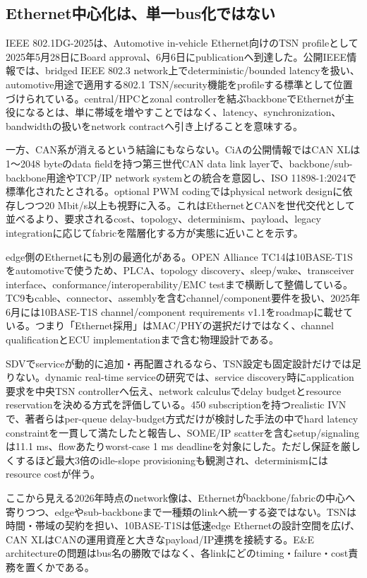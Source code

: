 \begin{surveyarticlebody}
\subsection{Ethernet中心化は、単一bus化ではない}

IEEE 802.1DG-2025は、Automotive in-vehicle Ethernet向けのTSN profileとして2025年5月28日にBoard approval、6月6日にpublicationへ到達した。公開IEEE情報では、bridged IEEE 802.3 network上でdeterministic/bounded latencyを扱い、automotive用途で適用する802.1 TSN/security機能をprofileする標準として位置づけられている。central/HPCとzonal controllerを結ぶbackboneでEthernetが主役になるとは、単に帯域を増やすことではなく、latency、synchronization、bandwidthの扱いをnetwork contractへ引き上げることを意味する。\autocite{src-0d68a9a04e3d,src-4e0a35202b0f}

一方、CAN系が消えるという結論にもならない。CiAの公開情報ではCAN XLは1〜2048 byteのdata fieldを持つ第三世代CAN data link layerで、backbone/sub-backbone用途やTCP/IP network systemとの統合を意図し、ISO 11898-1:2024で標準化されたとされる。optional PWM codingではphysical network designに依存しつつ20 Mbit/s以上も視野に入る。これはEthernetとCANを世代交代として並べるより、要求されるcost、topology、determinism、payload、legacy integrationに応じてfabricを階層化する方が実態に近いことを示す。\autocite{src-b7cb6b22b2e4}

edge側のEthernetにも別の最適化がある。OPEN Alliance TC14は10BASE-T1Sをautomotiveで使うため、PLCA、topology discovery、sleep/wake、transceiver interface、conformance/interoperability/EMC testまで横断して整備している。TC9もcable、connector、assemblyを含むchannel/component要件を扱い、2025年6月には10BASE-T1S channel/component requirements v1.1をroadmapに載せている。つまり「Ethernet採用」はMAC/PHYの選択だけではなく、channel qualificationとECU implementationまで含む物理設計である。\autocite{src-470ecee4f411,src-4df5f45556b0}

SDVでserviceが動的に追加・再配置されるなら、TSN設定も固定設計だけでは足りない。dynamic real-time serviceの研究では、service discovery時にapplication要求を中央TSN controllerへ伝え、network calculusでdelay budgetとresource reservationを決める方式を評価している。450 subscriptionを持つrealistic IVNで、著者らはper-queue delay-budget方式だけが検討した手法の中でhard latency constraintを一貫して満たしたと報告し、SOME/IP scatterを含むsetup/signalingは11.1 ms、flowあたりworst-case 1 ms deadlineを対象にした。ただし保証を厳しくするほど最大3倍のidle-slope provisioningも観測され、determinismにはresource costが伴う。\autocite{src-0b4e94520719}

ここから見える2026年時点のnetwork像は、Ethernetがbackbone/fabricの中心へ寄りつつ、edgeやsub-backboneまで一種類のlinkへ統一する姿ではない。TSNは時間・帯域の契約を担い、10BASE-T1Sは低速edge Ethernetの設計空間を広げ、CAN XLはCANの運用資産と大きなpayload/IP連携を接続する。E\&E architectureの問題はbus名の勝敗ではなく、各linkにどのtiming・failure・cost責務を置くかである。\autocite{src-0d68a9a04e3d,src-470ecee4f411,src-4e0a35202b0f,src-b7cb6b22b2e4}
\end{surveyarticlebody}

